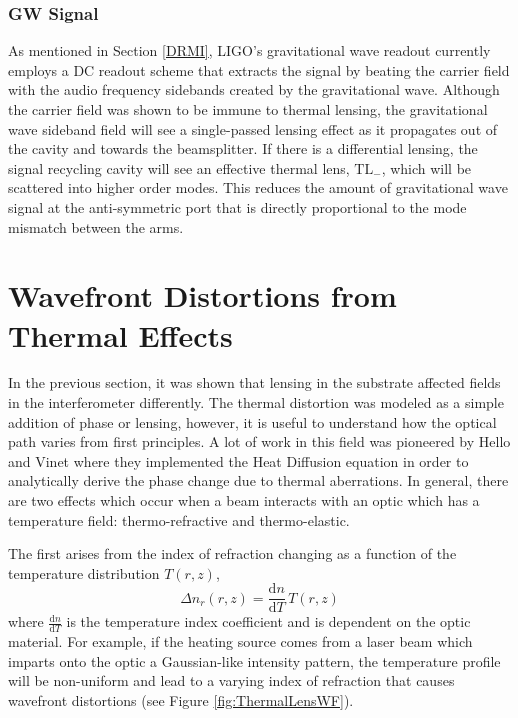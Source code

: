 		\subsubsection{GW Signal}
		As mentioned in Section \ref{DRMI}, LIGO's gravitational wave readout currently employs a DC readout scheme that extracts the signal by beating the carrier field with the audio frequency sidebands created by the gravitational wave.  Although the carrier field was shown to be immune to thermal lensing, the gravitational wave sideband field will see a single-passed lensing effect as it propagates out of the cavity and towards the beamsplitter.  If there is a differential lensing, the signal recycling cavity will see an effective thermal lens, $\text{TL}_{-}$, which will be scattered into higher order modes.  This reduces the amount of gravitational wave signal at the anti-symmetric port that is directly proportional to the mode mismatch between the arms.
	
	\section{Wavefront Distortions from Thermal Effects}\label{sec:wf_dist}
	In the previous section, it was shown that lensing in the substrate affected fields in the interferometer differently.  The thermal distortion was modeled as a simple addition of phase or lensing, however, it is useful to understand how the optical path varies from first principles.  A lot of work in this field was pioneered by Hello and Vinet \cite{hello_vinet} \cite{Vinet_Thermal_Issues} where they implemented the Heat Diffusion equation in order to analytically derive the phase change due to thermal aberrations.  In general, there are two effects which occur when a beam interacts with an optic which has a temperature field: thermo-refractive and thermo-elastic.  
	
	The first arises from the index of refraction changing as a function of the temperature distribution $T(r,z)$,
	\begin{equation}
	\Delta n_{r}(r,z) = \frac{\text{d}n}{\text{d}T} \, T(r,z)
	\end{equation}
	where $\frac{\text{d}n}{\text{d}T}$ is the temperature index coefficient and is dependent on the optic material.  For example, if the heating source comes from a laser beam which imparts onto the optic a Gaussian-like intensity pattern, the temperature profile will be non-uniform and lead to a varying index of refraction that causes wavefront distortions (see Figure \ref{fig:ThermalLensWF}).

